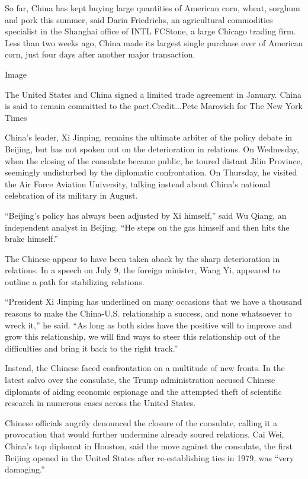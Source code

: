 So far, China has kept buying large quantities of American corn, wheat,
sorghum and pork this summer, said Darin Friedrichs, an agricultural
commodities specialist in the Shanghai office of INTL FCStone, a large
Chicago trading firm. Less than two weeks ago, China made its largest
single purchase ever of American corn, just four days after another
major transaction.

Image

The United States and China signed a limited trade agreement in January.
China is said to remain committed to the pact.Credit...Pete Marovich for
The New York Times

China's leader, Xi Jinping, remains the ultimate arbiter of the policy
debate in Beijing, but has not spoken out on the deterioration in
relations. On Wednesday, when the closing of the consulate became
public, he toured distant Jilin Province, seemingly undisturbed by the
diplomatic confrontation. On Thursday, he visited the Air Force Aviation
University, talking instead about China's national celebration of its
military in August.

``Beijing's policy has always been adjusted by Xi himself,'' said Wu
Qiang, an independent analyst in Beijing. ``He steps on the gas himself
and then hits the brake himself.''

The Chinese appear to have been taken aback by the sharp deterioration
in relations. In a speech on July 9, the foreign minister, Wang Yi,
appeared to outline a path for stabilizing relations.

``President Xi Jinping has underlined on many occasions that we have a
thousand reasons to make the China-U.S. relationship a success, and none
whatsoever to wreck it,'' he said. ``As long as both sides have the
positive will to improve and grow this relationship, we will find ways
to steer this relationship out of the difficulties and bring it back to
the right track.''

Instead, the Chinese faced confrontation on a multitude of new fronts.
In the latest salvo over the consulate, the Trump administration accused
Chinese diplomats of aiding economic espionage and the attempted theft
of scientific research in numerous cases across the United States.

Chinese officials angrily denounced the closure of the consulate,
calling it a provocation that would further undermine already soured
relations. Cai Wei, China's top diplomat in Houston, said the move
against the consulate, the first Beijing opened in the United States
after re-establishing ties in 1979, was ``very damaging.''

